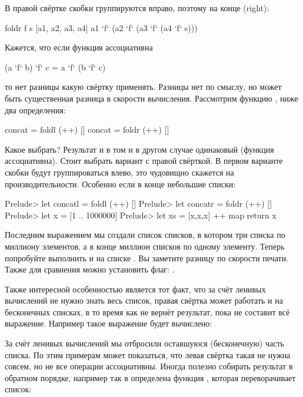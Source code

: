 В правой свёртке  скобки группируются вправо, поэтому на конце
 (right):


\begin{code}
foldr f s [a1, a2, a3, a4]
    a1 `f` (a2 `f` (a3 `f` (a4 `f` s)))
\end{code}

Кажется, что если функция  ассоциативна


\begin{code}
(a `f` b) `f` c  = a `f` (b `f` c)
\end{code}

\noindent 

то нет разницы какую свёртку применять. Разницы нет по смыслу, но может
быть существенная разница в скорости вычисления. Рассмотрим функцию
, ниже два определения:


\begin{code}
concat  = foldl (++) []
concat  = foldr (++) []
\end{code}

Какое выбрать? Результат и в том и в другом случае одинаковый (функция
\In{++} ассоциативна). Стоит выбрать вариант с правой свёрткой. В первом
варианте скобки будут группироваться влево, это чудовищно скажется на
производительности. Особенно если в конце небольшие списки:


\begin{code}
Prelude> let concatl  = foldl (++) []
Prelude> let concatr  = foldr (++) []
Prelude> let x = [1 .. 1000000]
Prelude> let xs = [x,x,x] ++ map return x
\end{code}

Последним выражением мы создали список списков, в котором три списка по
миллиону элементов, а в конце миллион списков по одному элементу. Теперь
попробуйте выполнить  и  на списке . Вы
заметите разницу по скорости печати. Также для сравнения можно
установить флаг: .

Также интересной особенностью  является тот факт, что за счёт
ленивых вычислений  не нужно знать весь список, правая свёртка
может работать и на бесконечных списках, в то время как  не
вернёт результат, пока не составит всё выражение. Например такое
выражение будет вычислено:



За счёт ленивых вычислений мы отбросили оставшуюся (бесконечную) часть
списка. По этим примерам может показаться, что левая свёртка такая не
нужна совсем, но не все операции ассоциативны. Иногда полезно собирать
результат в обратном порядке, например так в  определена
функция , которая переворачивает список:


